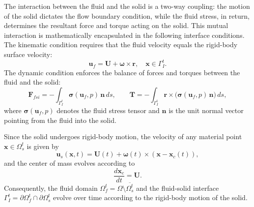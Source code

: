\documentclass{article}
\begin{document}
The interaction between the fluid and the solid is a two-way coupling: the motion of the solid dictates the flow boundary condition, while the fluid stress, in return, determines the resultant force and torque acting on the solid. This mutual interaction is mathematically encapsulated in the following interface conditions.
The {kinematic condition} requires that the fluid velocity equals the rigid-body surface velocity:
\begin{equation}\label{eq:kinematic_coupling}
    \mathbf{u}_f = \mathbf{U} + \boldsymbol{\omega} \times \mathbf{r}, \quad \mathbf{x} \in \Gamma_I^t.
\end{equation}
The {dynamic condition} enforces the balance of forces and torques between the fluid and the solid:
\begin{equation}\label{eq:dynamic_coupling}
    \mathbf{F}_{fsi} = -\int_{\Gamma_I^t} \boldsymbol{\sigma}(\mathbf{u}_f, p)\, \mathbf{n}\, ds, \qquad
    \mathbf{T} = -\int_{\Gamma_I^t} \mathbf{r} \times \big(\boldsymbol{\sigma}(\mathbf{u}_f, p)\, \mathbf{n}\big)\, ds,
\end{equation}
where $\boldsymbol{\sigma}(\mathbf{u}_f,p)$ denotes the fluid stress tensor and $\mathbf{n}$ is the unit normal vector pointing from the fluid into the solid.

Since the solid undergoes rigid-body motion, the velocity of any material point $\mathbf{x} \in \Omega_s^t$ is given by
\begin{equation}\label{eq:solid_velocity_field}
    \mathbf{u}_s(\mathbf{x},t) = \mathbf{U}(t) + \boldsymbol{\omega}(t) \times (\mathbf{x} - \mathbf{x}_c(t)),
\end{equation}
and the center of mass evolves according to
\begin{equation}\label{eq:cm_evolution}
    \frac{d\mathbf{x}_c}{dt} = \mathbf{U}.
\end{equation}
Consequently, the fluid domain $\Omega_f^t = \Omega \setminus \overline{\Omega_s^t}$ and the fluid-solid interface $\Gamma_I^t = \partial \Omega_f^t \cap \partial \Omega_s^t$ evolve over time according to the rigid-body motion of the solid.
\end{document}
